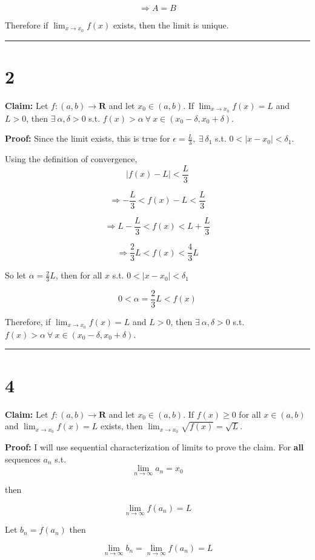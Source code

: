 \documentclass[10pt,letterpaper]{article}
\newcommand\R{\mathbf{R}}
\newcommand\ds{\displaystyle}
\newcommand\qedsym{\hfill \rule{2mm}{2mm}}
\begin{document}
\[\Rightarrow A=B\]

Therefore if $\ds\lim_{x\to x_0} f(x)$ exists, then the limit is unique. \qedsym

\section*{2}

\textbf{Claim:} Let $f:(a, b)\rightarrow\R$ and let $x_0\in(a, b)$. If $\ds\lim_{x\to x_0} f(x) = L$ and $L>0$, then $\exists\ \alpha, \delta>0$ s.t. $f(x)>\alpha\ \forall\ x\in(x_0-\delta, x_0+\delta)$.

\medskip

\textbf{Proof:} Since the limit exists, this is true for $\epsilon = \frac{L}{3},\ \exists\ \delta_1$ s.t. $0<|x-x_0| < \delta_1$.

Using the definition of convergence,
\[|f(x) - L| < \frac{L}{3}\]

\[\Rightarrow -\frac{L}{3} < f(x) - L < \frac{L}{3}\]

\[\Rightarrow L-\frac{L}{3} < f(x) < L+\frac{L}{3}\]

\[\Rightarrow \frac{2}{3}L < f(x) < \frac{4}{3}L\]

So let $\alpha = \frac{2}{3}L$, then for all $x$ s.t. $0 < |x-x_0| < \delta_1$

\[0 < \alpha = \frac{2}{3}L < f(x)\]

Therefore, if $\ds\lim_{x\to x_0} f(x) = L$ and $L>0$, then $\exists\ \alpha, \delta>0$ s.t. $f(x)>\alpha\ \forall\ x\in(x_0-\delta, x_0+\delta)$.

\qedsym

\section*{4}

\textbf{Claim:} Let $f:(a, b)\rightarrow\R$ and let $x_0\in(a, b)$. If $f(x) \geq 0$ for all $x\in(a,b)$ and $\ds\lim_{x\to x_0} f(x) = L$ exists, then $\ds\lim_{x\to x_0} \sqrt{f(x)} = \sqrt{L}$.

\medskip

\textbf{Proof:} I will use sequential characterization of limits to prove the claim. For \textbf{all} sequences $a_n$ s.t. \[\ds\lim_{n\to\infty} a_n = x_0\]

then

\[\ds\lim_{n\to\infty}f(a_n) = L\]

Let $b_n = f(a_n)$ then

\[\ds\lim_{n\to\infty}b_n = \ds\lim_{n\to\infty}f(a_n) = L\]
\end{document}
